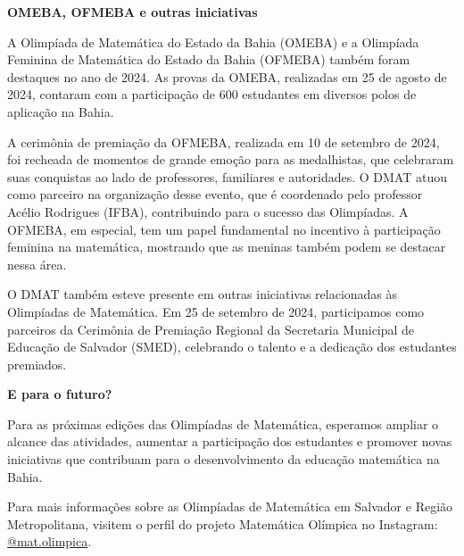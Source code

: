 \documentclass{hipatia}
\begin{document}
\vspace{0.5cm}

{\bf \noindent OMEBA, OFMEBA e outras iniciativas}

\vspace{0.5cm}

A Olimpíada de Matemática do Estado da Bahia (OMEBA) e a Olimpíada Feminina de Matemática do Estado da Bahia (OFMEBA) também foram destaques no ano de 2024. As provas da OMEBA, realizadas em 25 de agosto de 2024, contaram com a participação de 600 estudantes em diversos polos de aplicação na Bahia.

A cerimônia de premiação da OFMEBA, realizada em 10 de setembro de 2024, foi recheada de momentos de grande emoção para as medalhistas, que celebraram suas conquistas ao lado de professores, familiares e autoridades. O DMAT atuou como parceiro na organização desse evento, que é coordenado pelo professor Acélio Rodrigues (IFBA), contribuindo para o sucesso das Olimpíadas. A OFMEBA, em especial, tem um papel fundamental no incentivo à participação feminina na matemática, mostrando que as meninas também podem se destacar nessa área.

O DMAT também esteve presente em outras iniciativas relacionadas às Olimpíadas de Matemática. Em 25 de setembro de 2024, participamos como parceiros da Cerimônia de Premiação Regional da Secretaria Municipal de Educação de Salvador (SMED), celebrando o talento e a dedicação dos estudantes premiados.


{\bf \noindent E para o futuro?}


Para as próximas edições das Olimpíadas de Matemática, esperamos ampliar o alcance das atividades, aumentar a participação dos estudantes e promover novas iniciativas que contribuam para o desenvolvimento da educação matemática na Bahia.

Para mais informações sobre as Olimpíadas de Matemática em Salvador e Região Metropolitana, visitem o perfil do projeto Matemática Olímpica no Instagram: \href{https://www.instagram.com/mat.olimpica/#}{@mat.olimpica}.
\end{document}

